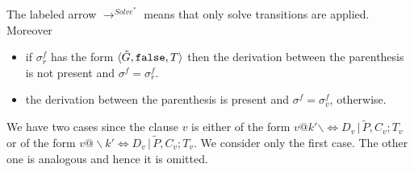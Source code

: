 \documentclass[final]{acmtrans2e}
\newcommand{\la}{\langle}
\newcommand{\ra}{\rangle}
\newcommand{\rrarrow}{\longrightarrow}
\begin{document}
The labeled arrow $\rrarrow^{Solve^{*}}$ means that only solve transitions are applied.
Moreover
\begin{itemize}
           \item if $\sigma_r^f$ has the form
$\la \tilde G, {\tt false}, T\ra$ then the derivation between the parenthesis is not present and $\sigma^f=\sigma_r^f$.
           \item the derivation between the parenthesis is present and $\sigma^f=\sigma_v^f$, otherwise.
         \end{itemize}
We have two cases since the clause $v$ is either of the form $v@k'\backslash \Leftrightarrow  D_v\,|\, \tilde P, C_v;T_v$
or of the form $v@\backslash k'\Leftrightarrow  D_v\,|\, \tilde P, C_v;T_v$. We consider only the first case. The other one is analogous and hence it is omitted.
\end{document}
